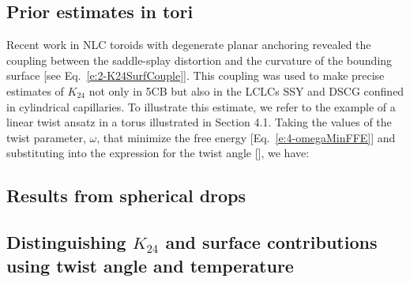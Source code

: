 \subsection{Prior estimates in tori}
Recent work in NLC toroids with degenerate planar anchoring revealed the coupling between the saddle-splay distortion and the curvature of the bounding surface [see Eq.~\ref{e:2-K24SurfCouple}].
This coupling was used to make precise estimates of $K_{24}$ not only in 5CB but also in the LCLCs SSY and DSCG confined in cylindrical capillaries.
To illustrate this estimate, we refer to the example of a linear twist ansatz in a torus illustrated in Section 4.1.
Taking the values of the twist parameter, $\omega$, that minimize the free energy [Eq.~\ref{e:4-omegaMinFFE}] and substituting into the expression for the twist angle [], we have:
\subsection{Results from spherical drops}
\subsection{Distinguishing $K_{24}$ and surface contributions using twist angle and temperature}
